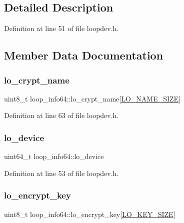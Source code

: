 \subsection{Detailed Description}


Definition at line 51 of file loopdev.\+h.



\subsection{Member Data Documentation}
\mbox{\label{structloop__info64_aff2f95f2ab2df109fe3b03fbd323e5c5}} 
\subsubsection{\texorpdfstring{lo\+\_\+crypt\+\_\+name}{lo\_crypt\_name}}
{\footnotesize\ttfamily uint8\+\_\+t loop\+\_\+info64\+::lo\+\_\+crypt\+\_\+name\mbox{[}\hyperlink{loopdev_8h_a37ee3183824e653a26b90f59ac3cc311}{L\+O\+\_\+\+N\+A\+M\+E\+\_\+\+S\+I\+ZE}\mbox{]}}



Definition at line 63 of file loopdev.\+h.

\mbox{\label{structloop__info64_ae1242f25b3f46d24ef41f537e3e5c24c}} 
\subsubsection{\texorpdfstring{lo\+\_\+device}{lo\_device}}
{\footnotesize\ttfamily uint64\+\_\+t loop\+\_\+info64\+::lo\+\_\+device}



Definition at line 53 of file loopdev.\+h.

\mbox{\label{structloop__info64_a31f33a9af4104d3895a005599b70918a}} 
\subsubsection{\texorpdfstring{lo\+\_\+encrypt\+\_\+key}{lo\_encrypt\_key}}
{\footnotesize\ttfamily uint8\+\_\+t loop\+\_\+info64\+::lo\+\_\+encrypt\+\_\+key\mbox{[}\hyperlink{loopdev_8h_a0e1c16cccb21fe5ee20f91b5f468c0b7}{L\+O\+\_\+\+K\+E\+Y\+\_\+\+S\+I\+ZE}\mbox{]}}




